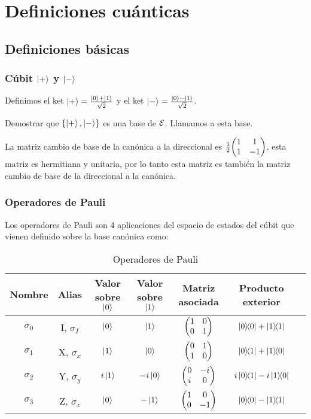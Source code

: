 \chapter{Definiciones cuánticas}\label{ch:definiciones-cuánticas}

\section{Definiciones básicas}\label{sec:definiciones-basicas}

\subsection{Cúbit $\ket{+}$ y $\ket{-}$}\label{subsec:cúbit-$ket{+}$-y-$ket{-}$}

\begin{definition}
	Definimos el ket $\ket{+}=\frac{\ket{0}+\ket{1}}{\sqrt{2}}$ y el ket $\ket{-}=\frac{\ket{0}-\ket{1}}{\sqrt{2}}$.
\end{definition}

\begin{exercise}
	Demostrar que $\qty{\ket{+}, \ket{-}}$ es una base de $\mathcal{E}$.
	Llamamos  a esta base.
\end{exercise}

La matriz cambio de base de la canónica a la direccional es $\frac{1}{2}\mqty(1 & 1 \\ 1 & -1)$, esta matriz es hermitiana y unitaria, por lo tanto esta matriz es también la matriz cambio de base de la direccional a la canónica.

\subsection{Operadores de Pauli}\label{subsec:operadores-de-pauli}

Los operadores de Pauli son 4 aplicaciones del espacio de estados del cúbit que vienen definido sobre la base canónica como:
\begin{table}[htbp]
	\caption{Operadores de Pauli\label{tab:operadores-de-pauli}}
	\centering
	\begin{tabular}{ccccccc}
		\toprule
		Nombre   & Alias         & Valor sobre $\ket{0}$ & Valor sobre $\ket{1}$ & Matriz asociada     & Producto exterior               \\
		\midrule
		$\sigma_0$ & I, $\sigma_I$ & $\ket{0}$             & $\ket{1}$             & $\mqty({\pmat{0}})$ & $\ketbra{0}{0}+\ketbra{1}{1}$   \\
		$\sigma_1$ & X, $\sigma_x$ & $\ket{1}$             & $\ket{0}$             & $\mqty({\pmat{1}})$ & $\ketbra{0}{1}+\ketbra{1}{0}$   \\
		$\sigma_2$ & Y, $\sigma_y$ & $i\ket{1}$            & $-i\ket{0}$           & $\mqty({\pmat{2}})$ & $i\ketbra{0}{1}-i\ketbra{1}{0}$ \\
		$\sigma_3$ & Z, $\sigma_z$ & $\ket{0}$             & $-\ket{1}$            & $\mqty({\pmat{3}})$ & $\ketbra{0}{0}-\ketbra{1}{1}$   \\
		\bottomrule
	\end{tabular}
\end{table}
